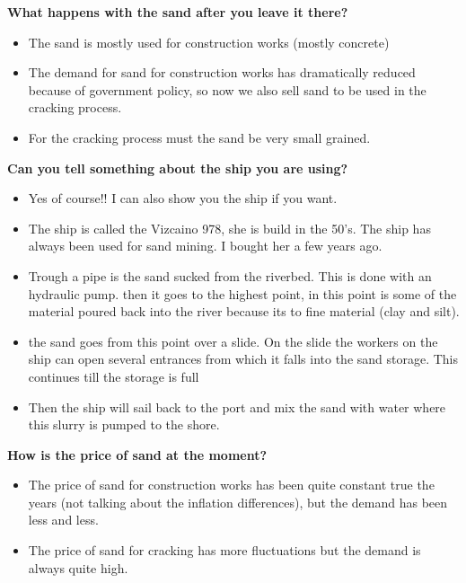 \textbf{What happens with the sand after you leave it there?}
\begin{itemize}
    \item The sand is mostly used for construction works (mostly concrete)
    \item The demand for sand for construction works has dramatically reduced because of government policy, so now we also sell sand to be used in the cracking process. 
    \item For the cracking process must the sand be very small grained. 
\end{itemize}

\textbf{Can you tell something about the ship you are using?}
\begin{itemize}
    \item Yes of course!! I can also show you the ship if you want. 
    \item The ship is called the Vizcaino 978, she is build in the 50's. The ship has always been used for sand mining. I bought her a few years ago. 
    \item Trough a pipe is the sand sucked from the riverbed. This is done with an hydraulic pump. then it goes to the highest point, in this point is some of the material poured back into the river because its to fine material (clay and silt). 
    \item the sand goes from this point over a slide. On the slide the workers on the ship can open several entrances from which it falls into the sand storage. This continues till the storage is full
    \item Then the ship will sail back to the port and mix the sand with water where this slurry is pumped to the shore. 
\end{itemize}

\textbf{How is the price of sand at the moment?}
\begin{itemize}
    \item The price of sand for construction works has been quite constant true the years (not talking about the inflation differences), but the demand has been less and less.
    \item The price of sand for cracking has more fluctuations but the demand is always quite high.
\end{itemize}

